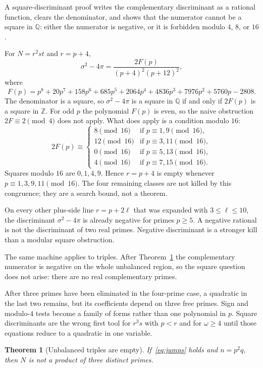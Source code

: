 \documentclass[11pt,reqno]{amsart}
\newtheorem{theorem}{Theorem}
\theoremstyle{definition}
\begin{document}
A square-discriminant proof writes the complementary discriminant as a rational function, clears the denominator, and shows that the numerator cannot be a square in \(\mathbb{Q}\): either the numerator is negative, or it is forbidden modulo \(4\), \(8\), or \(16\).

For \(N=r^2st\) and \(r=p+4\),
\[
\sigma^2-4\pi=\frac{2F(p)}{(p+4)^2(p+12)^2},
\]
where
\[
F(p)=p^8+20p^7+158p^6+685p^5+2064p^4+4836p^3+7976p^2+5760p-2808.
\]
The denominator is a square, so \(\sigma^2-4\pi\) is a square in \(\mathbb{Q}\) if and only if \(2F(p)\) is a square in \(\mathbb{Z}\). For odd \(p\) the polynomial \(F(p)\) is even, so the naive obstruction \(2F\equiv 2\pmod{4}\) does not apply. What does apply is a condition modulo \(16\):
\[
2F(p)\equiv
\begin{cases}
8\pmod{16}&\text{if }p\equiv 1,9\pmod{16},\\
12\pmod{16}&\text{if }p\equiv 3,11\pmod{16},\\
0\pmod{16}&\text{if }p\equiv 5,13\pmod{16},\\
4\pmod{16}&\text{if }p\equiv 7,15\pmod{16}.
\end{cases}
\]
Squares modulo \(16\) are \(0,1,4,9\). Hence \(r=p+4\) is empty whenever \(p\equiv 1,3,9,11\pmod{16}\). The four remaining classes are not killed by this congruence; they are a search bound, not a theorem.

On every other plus-side line \(r=p+2\ell\) that was expanded with \(3\le\ell\le 10\), the discriminant \(\sigma^2-4\pi\) is already negative for primes \(p\ge 5\). A negative rational is not the discriminant of two real primes. Negative discriminant is a stronger kill than a modular square obstruction.

The same machine applies to triples. After Theorem~\ref{thm:R1} the complementary numerator is negative on the whole unbalanced region, so the square question does not arise: there are no real complementary primes.

After three primes have been eliminated in the four-prime case, a quadratic in the last two remains, but its coefficients depend on three free primes. Sign and modulo-\(4\) tests become a family of forms rather than one polynomial in \(p\). Square discriminants are the wrong first tool for \(r^3s\) with \(p<r\) and for \(\omega\ge 4\) until those equations reduce to a quadratic in one variable.

\begin{theorem}[Unbalanced triples are empty]
\label{thm:R1}
If~\eqref{eq:jumps} holds and \(n=p^2q\), then \(N\) is not a product of three distinct primes.
\end{theorem}
\end{document}
